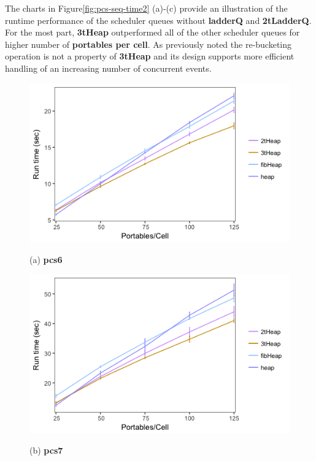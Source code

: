 The charts in Figure\ref{fig:pcs-seq-time2} (a)-(c) provide an illustration of the runtime performance of the scheduler queues without \textbf{ladderQ} and \textbf{2tLadderQ}. For the most part, \textbf{3tHeap} outperformed all of the other scheduler queues for higher number of \textbf{portables per cell}. As previously noted the re-bucketing operation is not a property of \textbf{3tHeap} and its design supports more efficient handling of an increasing number of concurrent events. 

\begin{figure}
\begin{minipage}{0.49\linewidth}
\includegraphics[width=\linewidth]{images/pcs6_runtime_partial2}
\centerline{(a) \textbf{pcs6}}
\end{minipage}
\begin{minipage}{0.49\linewidth}
\includegraphics[width=\linewidth]{images/pcs7_runtime_partial2}
\centerline{(b) \textbf{pcs7}}
\end{minipage}


\end{figure}
